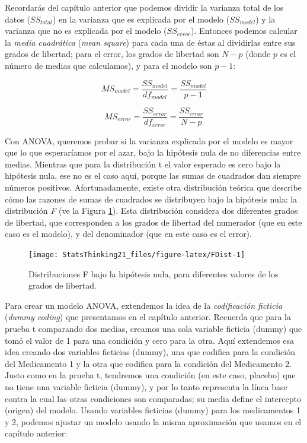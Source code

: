 \documentclass[
  12pt,
]{book}
\begin{document}
Recordarás del capítulo anterior que podemos dividir la varianza total de los datos (\(SS_{total}\)) en la varianza que es explicada por el modelo (\(SS_{model}\)) y la varianza que no es explicada por el modelo (\(SS_{error}\)). Entonces podemos calcular la \emph{media cuadrática} (\emph{mean square}) para cada una de éstas al dividirlas entre sus grados de libertad; para el error, los grados de libertad son \(N - p\) (donde \(p\) es el número de medias que calculamos), y para el modelo son \(p - 1\):

\[
MS_{model} =\frac{SS_{model}}{df_{model}}= \frac{SS_{model}}{p-1}
\]

\[
MS_{error} = \frac{SS_{error}}{df_{error}} = \frac{SS_{error}}{N - p}
\]

Con ANOVA, queremos probar si la varianza explicada por el modelo es mayor que lo que esperaríamos por el azar, bajo la hipótesis nula de no diferencias entre medias. Mientras que para la distribución t el valor esperado es cero bajo la hipótesis nula, ese no es el caso aquí, porque las sumas de cuadrados dan siempre números positivos. Afortunadamente, existe otra distribución teórica que describe cómo las razones de sumas de cuadrados se distribuyen bajo la hipótesis nula: la distribución \emph{F} (ve la Figura \ref{fig:FDist}). Esta distribución considera dos diferentes grados de libertad, que corresponden a los grados de libertad del numerador (que en este caso es el modelo), y del denominador (que en este caso es el error).

\begin{figure}
\texttt{[image: StatsThinking21\_files/figure-latex/FDist-1]} \caption{Distribuciones F bajo la hipótesis nula, para diferentes valores de los grados de libertad.}\label{fig:FDist}
\end{figure}

Para crear un modelo ANOVA, extendemos la idea de la \emph{codificación ficticia} (\emph{dummy coding}) que presentamos en el capítulo anterior. Recuerda que para la prueba t comparando dos medias, creamos una sola variable ficticia (dummy) que tomó el valor de 1 para una condición y cero para la otra. Aquí extendemos esa idea creando dos variables ficticias (dummy), una que codifica para la condición del Medicamento 1 y la otra que codifica para la condición del Medicamento 2. Justo como en la prueba t, tendremos una condición (en este caso, placebo) que no tiene una variable ficticia (dummy), y por lo tanto representa la línea base contra la cual las otras condiciones son comparadas; su media define el intercepto (origen) del modelo. Usando variables ficticias (dummy) para los medicamentos 1 y 2, podemos ajustar un modelo usando la misma aproximación que usamos en el capítulo anterior:
\end{document}
